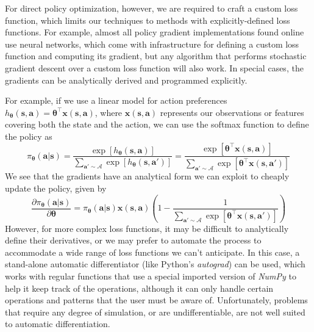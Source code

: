 \documentclass{article}
\begin{document}
For direct policy optimization, however, we are required to craft a custom loss function, which limits our techniques to methods with explicitly-defined loss functions. For example, almost all policy gradient implementations found online use neural networks, which come with infrastructure for defining a custom loss function and computing its gradient, but any algorithm that performs stochastic gradient descent over a custom loss function will also work. In special cases, the gradients can be analytically derived and programmed explicitly. 

For example, if we use a linear model for action preferences $h_{\boldsymbol{\theta}}(\mathbf{s},\mathbf{a})=\boldsymbol{\theta}^\top\mathbf{x}(\mathbf{s},\mathbf{a})$, where $\mathbf{x}(\mathbf{s},\mathbf{a})$ represents our observations or features covering both the state and the action, we can use the softmax function to define the policy as \begin{equation}\pi_{\boldsymbol{\theta}}(\mathbf{a}|\mathbf{s})=\frac{\exp[h_{\boldsymbol{\theta}}(\mathbf{s},\mathbf{a})]}{\sum_{\mathbf{a}'\sim\mathcal{A}}\exp[h_{\boldsymbol{\theta}}(\mathbf{s},\mathbf{a}')]}=\frac{\exp[\boldsymbol{\theta}^\top\mathbf{x}(\mathbf{s},\mathbf{a})]}{\sum_{\mathbf{a}'\sim\mathcal{A}}\exp[\boldsymbol{\theta}^\top\mathbf{x}(\mathbf{s},\mathbf{a}')]}\end{equation}We see that the gradients have an analytical form we can exploit to cheaply update the policy, given by \begin{equation}\frac{\partial \pi_{\boldsymbol{\theta}}(\mathbf{a}|\mathbf{s})}{\partial \boldsymbol{\theta}}=\pi_{\boldsymbol{\theta}}(\mathbf{a}|\mathbf{s})\mathbf{x}(\mathbf{s},\mathbf{a})\left(1-\frac{1}{\sum_{\mathbf{a}'\sim\mathcal{A}}\exp[\boldsymbol{\theta}^\top\mathbf{x}(\mathbf{s},\mathbf{a}')]}\right)\end{equation}
However, for more complex loss functions, it may be difficult to analytically define their derivatives, or we may prefer to automate the process to accommodate a wide range of loss functions we can't anticipate. In this case, a stand-alone automatic differentiator (like Python's \textit{autograd}) can be used, which works with regular functions that use a special imported version of \textit{NumPy} to help it keep track of the operations, although it can only handle certain operations and patterns that the user must be aware of. Unfortunately, problems that require any degree of simulation, or are undifferentiable, are not well suited to automatic differentiation.
\end{document}
